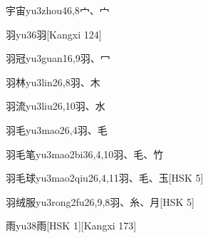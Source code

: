 \begin{EntryWithPhonetic}{宇宙}{yu3zhou4}{6,8}{⼧、⼧}
\end{EntryWithPhonetic}

\begin{EntryWithPhonetic}{羽}{yu3}{6}{⽻}[Kangxi 124]
\end{EntryWithPhonetic}

\begin{EntryWithPhonetic}{羽冠}{yu3guan1}{6,9}{⽻、⼍}
\end{EntryWithPhonetic}

\begin{EntryWithPhonetic}{羽林}{yu3lin2}{6,8}{⽻、⽊}
\end{EntryWithPhonetic}

\begin{EntryWithPhonetic}{羽流}{yu3liu2}{6,10}{⽻、⽔}
\end{EntryWithPhonetic}

\begin{EntryWithPhonetic}{羽毛}{yu3mao2}{6,4}{⽻、⽑}
\end{EntryWithPhonetic}

\begin{EntryWithPhonetic}{羽毛笔}{yu3mao2bi3}{6,4,10}{⽻、⽑、⽵}
\end{EntryWithPhonetic}

\begin{EntryWithPhonetic}{羽毛球}{yu3mao2qiu2}{6,4,11}{⽻、⽑、⽟}[HSK 5]
\end{EntryWithPhonetic}

\begin{EntryWithPhonetic}{羽绒服}{yu3rong2fu2}{6,9,8}{⽻、⽷、⽉}[HSK 5]
\end{EntryWithPhonetic}

\begin{EntryWithPhonetic}{雨}{yu3}{8}{⾬}[HSK 1][Kangxi 173]
\end{EntryWithPhonetic}

